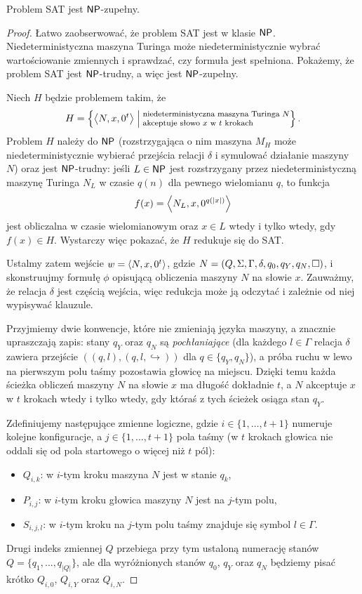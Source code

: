 \begin{theorem}\label{t:Cook-Levin}
    Problem SAT jest $\textsf{NP}$-zupełny.
\end{theorem}
\begin{proof}
    Łatwo zaobserwować, że problem SAT jest w klasie $\textsf{NP}$. Niedeterministyczna maszyna Turinga może niedeterministycznie wybrać wartościowanie zmiennych i sprawdzać, czy formuła jest spełniona. Pokażemy, że problem SAT jest $\textsf{NP}$-trudny, a więc jest $\textsf{NP}$-zupełny.

    Niech $H$ będzie problemem takim, że
    \[ H = \left\{\encode{N, x, 0^t} \Bigm| \parbox{15em}{\footnotesize niedeterministyczna maszyna Turinga $N$ akceptuje słowo $x$ w $t$ krokach}\right\}. \]
    Problem $H$ należy do $\textsf{NP}$ (rozstrzygająca o nim maszyna $M_H$ może niedeterministycznie wybierać przejścia relacji $\delta$ i symulować działanie maszyny $N$) oraz jest $\textsf{NP}$-trudny: jeśli $L \in \textsf{NP}$ jest rozstrzygany przez niedeterministyczną maszynę Turinga $N_L$ w czasie $q(n)$ dla pewnego wielomianu $q$, to funkcja
    \[ f(x) = \left\langle N_L, x, 0^{q(|x|)} \right\rangle \]
    jest obliczalna w czasie wielomianowym oraz $x \in L$ wtedy i tylko wtedy, gdy $f(x) \in H$.
    Wystarczy więc pokazać, że $H$ redukuje się do SAT.

    Ustalmy zatem wejście $w = \left\langle N, x, 0^t \right\rangle$, gdzie $N = (Q, \Sigma, \Gamma, \delta, q_0, q_Y, q_N, \square)$, i skonstruujmy formułę $\phi$ opisującą obliczenia maszyny $N$ na słowie $x$. Zauważmy, że relacja $\delta$ jest częścią wejścia, więc redukcja może ją odczytać i zależnie od niej wypisywać klauzule.

    Przyjmiemy dwie konwencje, które nie zmieniają języka maszyny, a znacznie upraszczają zapis: stany $q_Y$ oraz $q_N$ są \emph{pochłaniające} (dla każdego $l \in \Gamma$ relacja $\delta$ zawiera przejście $\left((q, l), (q, l, \hookrightarrow)\right)$ dla $q \in \{q_Y, q_N\}$), a próba ruchu w lewo na pierwszym polu taśmy pozostawia głowicę na miejscu.
    Dzięki temu każda ścieżka obliczeń maszyny $N$ na słowie $x$ ma długość dokładnie $t$, a $N$ akceptuje $x$ w $t$ krokach wtedy i tylko wtedy, gdy któraś z tych ścieżek osiąga stan $q_Y$.

    Zdefiniujemy następujące zmienne logiczne, gdzie $i \in \{1, \ldots, t+1\}$ numeruje kolejne konfiguracje, a $j \in \{1, \ldots, t+1\}$ pola taśmy (w $t$ krokach głowica nie oddali się od pola startowego o więcej niż $t$ pól):
    \begin{itemize}
        \item $Q_{i, k}$: w $i$-tym kroku maszyna $N$ jest w stanie $q_k$,
        \item $P_{i, j}$: w $i$-tym kroku głowica maszyny $N$ jest na $j$-tym polu,
        \item $S_{i, j, l}$: w $i$-tym kroku na $j$-tym polu taśmy znajduje się symbol $l \in \Gamma$.
    \end{itemize}
    Drugi indeks zmiennej $Q$ przebiega przy tym ustaloną numerację stanów $Q = \{q_1, \ldots, q_{|Q|}\}$, ale dla wyróżnionych stanów $q_0$, $q_Y$ oraz $q_N$ będziemy pisać krótko $Q_{i, 0}$, $Q_{i, Y}$ oraz $Q_{i, N}$.


\end{proof}
